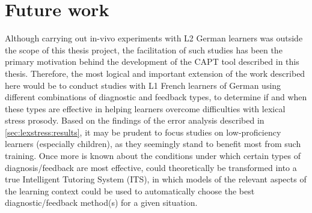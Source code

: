 % 
% 
 
 


\section{Future work}
\label{sec:conclusion:future}

Although carrying out in-vivo experiments with L2 German learners was outside the scope of this thesis project, the facilitation of such studies has been the primary motivation behind the development of the  CAPT tool described in this thesis. Therefore, the most logical and important extension of the work described here would be to conduct studies with L1 French learners of German using different combinations of diagnostic and feedback types, to determine if and when these types are effective in helping learners overcome difficulties with lexical stress prosody. 
	Based on the findings of the error analysis described in \cref{sec:lexstress:results}, it may be prudent to focus studies on low-proficiency learners (especially children), as they seemingly stand to benefit most from such training.
	Once more is known about the conditions under which certain types of diagnosis/feedback are most effective,  could theoretically be transformed into a true Intelligent Tutoring System (ITS), in which models of the relevant aspects of the learning context could be used to automatically choose the best diagnostic/feedback method(s) for a given situation.

